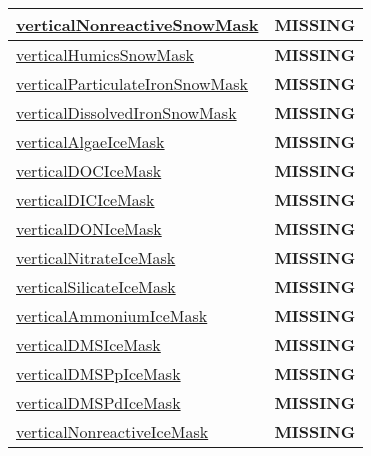 {\begin{center}
\begin{longtable}{| p{2.0in} | p{4.0in} |}
    \hline
    \hyperref[subsec:var_sec_tracer_masks_verticalNonreactiveSnowMask]{verticalNonreactiveSnowMask} & {\bf \color{red} MISSING} \\
    \hline
    \hyperref[subsec:var_sec_tracer_masks_verticalHumicsSnowMask]{verticalHumicsSnowMask} & {\bf \color{red} MISSING} \\
    \hline
    \hyperref[subsec:var_sec_tracer_masks_verticalParticulateIronSnowMask]{verticalParticulateIronSnowMask} & {\bf \color{red} MISSING} \\
    \hline
    \hyperref[subsec:var_sec_tracer_masks_verticalDissolvedIronSnowMask]{verticalDissolvedIronSnowMask} & {\bf \color{red} MISSING} \\
    \hline
    \hyperref[subsec:var_sec_tracer_masks_verticalAlgaeIceMask]{verticalAlgaeIceMask} & {\bf \color{red} MISSING} \\
    \hline
    \hyperref[subsec:var_sec_tracer_masks_verticalDOCIceMask]{verticalDOCIceMask} & {\bf \color{red} MISSING} \\
    \hline
    \hyperref[subsec:var_sec_tracer_masks_verticalDICIceMask]{verticalDICIceMask} & {\bf \color{red} MISSING} \\
    \hline
    \hyperref[subsec:var_sec_tracer_masks_verticalDONIceMask]{verticalDONIceMask} & {\bf \color{red} MISSING} \\
    \hline
    \hyperref[subsec:var_sec_tracer_masks_verticalNitrateIceMask]{verticalNitrateIceMask} & {\bf \color{red} MISSING} \\
    \hline
    \hyperref[subsec:var_sec_tracer_masks_verticalSilicateIceMask]{verticalSilicateIceMask} & {\bf \color{red} MISSING} \\
    \hline
    \hyperref[subsec:var_sec_tracer_masks_verticalAmmoniumIceMask]{verticalAmmoniumIceMask} & {\bf \color{red} MISSING} \\
    \hline
    \hyperref[subsec:var_sec_tracer_masks_verticalDMSIceMask]{verticalDMSIceMask} & {\bf \color{red} MISSING} \\
    \hline
    \hyperref[subsec:var_sec_tracer_masks_verticalDMSPpIceMask]{verticalDMSPpIceMask} & {\bf \color{red} MISSING} \\
    \hline
    \hyperref[subsec:var_sec_tracer_masks_verticalDMSPdIceMask]{verticalDMSPdIceMask} & {\bf \color{red} MISSING} \\
    \hline
    \hyperref[subsec:var_sec_tracer_masks_verticalNonreactiveIceMask]{verticalNonreactiveIceMask} & {\bf \color{red} MISSING} \\
    \hline

\end{longtable}
\end{center}}
